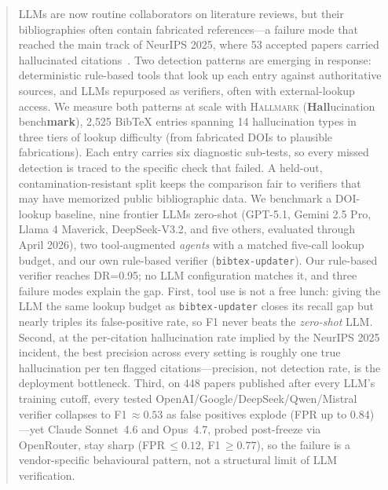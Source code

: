 \begin{abstract}
LLMs are now routine collaborators on literature reviews, but their bibliographies often contain fabricated references---a failure mode that reached the main track of NeurIPS 2025, where 53 accepted papers carried hallucinated citations~\citep{neurips2025incident}.
Two detection patterns are emerging in response: deterministic rule-based tools that look up each entry against authoritative sources, and LLMs repurposed as verifiers, often with external-lookup access.
We measure both patterns at scale with \textsc{Hallmark} (\textbf{Hall}ucination bench\textbf{mark}), 2{,}525 BibTeX entries spanning 14 hallucination types in three tiers of lookup difficulty (from fabricated DOIs to plausible fabrications).
Each entry carries six diagnostic sub-tests, so every missed detection is traced to the specific check that failed.
A held-out, contamination-resistant split keeps the comparison fair to verifiers that may have memorized public bibliographic data.
We benchmark a DOI-lookup baseline, nine frontier LLMs zero-shot (GPT-5.1, Gemini 2.5 Pro, Llama 4 Maverick, DeepSeek-V3.2, and five others, evaluated through April 2026), two tool-augmented \emph{agents} with a matched five-call lookup budget, and our own rule-based verifier (\texttt{bibtex-updater}).
Our rule-based verifier reaches DR=0.95; no LLM configuration matches it, and three failure modes explain the gap.
First, tool use is not a free lunch: giving the LLM the same lookup budget as \texttt{bibtex-updater} closes its recall gap but nearly triples its false-positive rate, so F1 never beats the \emph{zero-shot} LLM.
Second, at the per-citation hallucination rate implied by the NeurIPS 2025 incident, the best precision across every setting is roughly one true hallucination per ten flagged citations---precision, not detection rate, is the deployment bottleneck.
Third, on 448 papers published after every LLM's training cutoff, every tested OpenAI/Google/DeepSeek/Qwen/Mistral verifier collapses to F1\,${\approx}0.53$ as false positives explode (FPR up to 0.84)---yet Claude Sonnet~4.6 and Opus~4.7, probed post-freeze via OpenRouter, stay sharp (FPR\,${\le}0.12$, F1\,${\ge}0.77$), so the failure is a vendor-specific behavioural pattern, not a structural limit of LLM verification.
\end{abstract}
